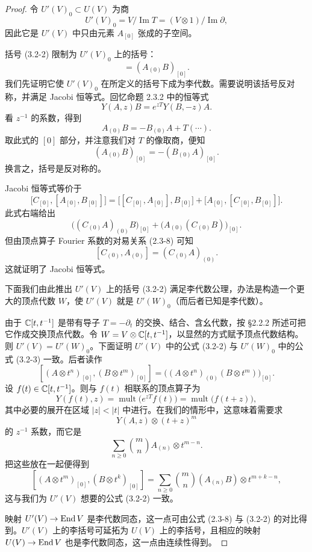 \begin{proof}
    令 $U'(V)_0\subset U(V)$ 为商
    \[
        U'(V)_0 = V/\operatorname{Im}T = (V\otimes 1)/\operatorname{Im}\partial,
    \]
    因此它是 $U'(V)$ 中只由元素 $A_{[0]}$ 张成的子空间。

    括号 (3.2-2) 限制为 $U'(V)_0$ 上的括号：
    \begin{equation}
        [A_{[0]}, B_{[0]}] = (A_{(0)}B)_{[0]}.
        \tag{3.2-3}
    \end{equation}
    我们先证明它使 $U'(V)_0$ 在所定义的括号下成为李代数。需要说明该括号反对称，并满足 Jacobi 恒等式。回忆命题 2.3.2 中的恒等式
    \[
        Y(A,z)B = e^{zT}Y(B,-z)A.
    \]
    看 $z^{-1}$ 的系数，得到
    \[
        A_{(0)}B = -B_{(0)}A + T(\cdots).
    \]
    取此式的 $[0]$ 部分，并注意我们对 $T$ 的像取商，便知
    \[
        (A_{(0)}B)_{[0]} = -(B_{(0)}A)_{[0]}.
    \]
    换言之，括号是反对称的。

    Jacobi 恒等式等价于
    \[
        \bigl[C_{[0]}, [A_{[0]}, B_{[0]}]\bigr]
        = \bigl[[C_{[0]}, A_{[0]}], B_{[0]}\bigr]
        + \bigl[A_{[0]}, [C_{[0]}, B_{[0]}]\bigr].
    \]
    此式右端给出
    \[
        \bigl((C_{(0)}A)_{(0)}B\bigr)_{[0]} + \bigl(A_{(0)}(C_{(0)}B)\bigr)_{[0]}.
    \]
    但由顶点算子 Fourier 系数的对易关系 (2.3-8) 可知
    \[
        [C_{(0)}, A_{(0)}] = (C_{(0)}A)_{(0)}.
    \]
    这就证明了 Jacobi 恒等式。

    下面我们由此推出 $U'(V)$ 上的括号 (3.2-2) 满足李代数公理，办法是构造一个更大的顶点代数 $W$，使 $U'(V)$ 就是 $U'(W)_0$（而后者已知是李代数）。

    由于 $\mathbb{C}[t,t^{-1}]$ 是带有导子 $T=-\partial_t$ 的交换、结合、含幺代数，按 §2.2.2 所述可把它作成交换顶点代数。令 $W=V\otimes\mathbb{C}[t,t^{-1}]$，以显然的方式赋予顶点代数结构。则 $U'(V)=U'(W)_0$。下面证明 $U'(V)$ 中的公式 (3.2-2) 与 $U'(W)_0$ 中的公式 (3.2-3) 一致。后者读作
    \[
        [(A\otimes t^n)_{[0]}, (B\otimes t^m)_{[0]}]
        = \bigl((A\otimes t^n)_{(0)}(B\otimes t^m)\bigr)_{[0]}.
    \]
    设 $f(t)\in\mathbb{C}[t,t^{-1}]$。则与 $f(t)$ 相联系的顶点算子为
    \[
        Y(f(t),z) = \operatorname{mult}\bigl(e^{zT}f(t)\bigr) = \operatorname{mult}\bigl(f(t+z)\bigr),
    \]
    其中必要的展开在区域 $|z|<|t|$ 中进行。在我们的情形中，这意味着需要求
    \[
        Y(A,z)\otimes (t+z)^m
    \]
    的 $z^{-1}$ 系数，而它是
    \[
        \sum_{n\ge 0}\binom{m}{n} A_{(n)}\otimes t^{m-n}.
    \]
    把这些放在一起便得到
    \[
        [(A\otimes t^m)_{[0]}, (B\otimes t^k)_{[0]}]
        = \sum_{n\ge 0}\binom{m}{n}(A_{(n)}B)\otimes t^{m+k-n},
    \]
    这与我们为 $U'(V)$ 想要的公式 (3.2-2) 一致。

    映射 $U'(V)\to\operatorname{End} V$ 是李代数同态，这一点可由公式 (2.3-8) 与 (3.2-2) 的对比得到。$U'(V)$ 上的李括号可延拓为 $U(V)$ 上的李括号，且相应的映射 $U(V)\to\operatorname{End} V$ 也是李代数同态，这一点由连续性得到。
\end{proof}

